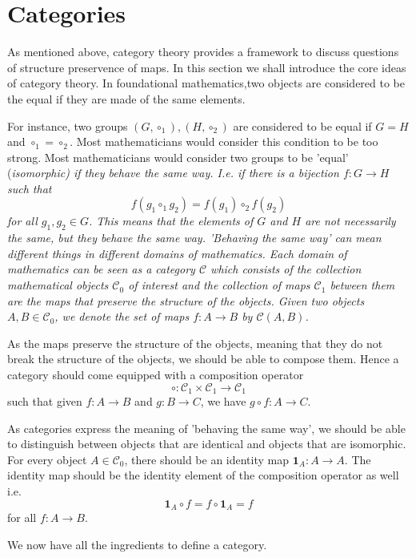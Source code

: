 \section{Categories}
As mentioned above, category theory provides a framework to discuss questions of 
structure preservence of maps.
In this section we shall introduce the core ideas of category theory.
In foundational mathematics,two objects 
are considered to be the equal if they are made of the same 
elements.

For instance, two groups $(G,\circ_1), (H,\circ_2)$ are considered to be equal if
$G=H$ and $\circ_1=\circ_2$.
Most mathematicians would consider this condition
to be too strong. Most mathematicians would consider two 
groups to be 'equal' (\it{isomorphic}) if they behave the same way.
I.e. if there is a bijection $f:G\to H$ such that
\[
    f(g_1\circ_1 g_2)=f(g_1)\circ_2 f(g_2)
\]
for all $g_1,g_2\in G$.
This means that the elements of $G$ and $H$ are not 
necessarily the same,
but they behave the same way.
'Behaving the same way' can mean 
different things in different domains of mathematics.
Each domain of mathematics
can be seen as a category $\mathcal{C}$ which consists
of the collection mathematical objects $\mathcal{C}_0$ of interest and 
the collection of maps $\mathcal{C}_1$ 
between them are the maps that preserve
the structure of the objects.
Given two objects $A,B\in\mathcal{C}_0$,
we denote the set of maps $f:A\to B$
by $\mathcal{C}(A,B)$.

As the maps preserve the structure of the objects, meaning
that they do not break the structure of the objects,
we should be able to compose them.
Hence a category should come equipped with a composition
operator
\[
    \circ:\mathcal{C}_1\times\mathcal{C}_1\to\mathcal{C}_1
\]
such that given $f:A\to B$ and $g:B\to C$,
we have $g\circ f:A\to C$.

As categories express the meaning of 'behaving the same way',
we should be able to distinguish
between objects that are identical and objects that are 
isomorphic.
For every object $A\in\mathcal{C}_0$,
there should be an identity map $\mathbf{1}_A:A\to A$.
The identity map should be the identity element of 
the composition operator as well i.e.
\[
    \mathbf{1}_A\circ f=f\circ \mathbf{1}_A=f
\]
for all $f:A\to B$.

We now have all the ingredients to define a category.

